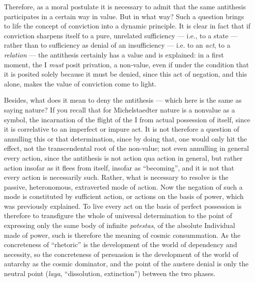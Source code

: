 Therefore, as a moral postulate it is necessary to admit that the same antithesis participates in a certain way in value. But in what way? Such a question brings to life the concept of conviction into a dynamic principle. It is clear in fact that if conviction sharpens itself to a pure, unrelated sufficiency --- i.e., to a state --- rather than to sufficiency as denial of an insufficiency --- i.e. to an \emph{act}, to a \emph{relation} --- the antithesis certainly has a value and is explained: in a first moment, the I \emph{must} posit privation, a non-value, even if under the condition that it is posited solely because it must be denied, since this act of negation, and this alone, makes the value of conviction come to light.

Besides, what does it mean to deny the antithesis --- which here is the same as saying nature? If you recall that for Michelstaedter nature is a nonvalue as a symbol, the incarnation of the flight of the I from actual possession of itself, since it is correlative to an imperfect or impure act. It is not therefore a question of annulling this or that determination, since by doing that, one would only hit the effect, not the transcendental root of the non-value; not even annulling in general every action, since the antithesis is not action qua action in general, but rather action insofar as it flees from itself, insofar as ``becoming'', and it is not that every action is necessarily such. Rather, what is necessary to resolve is the passive, heteronomous, extraverted mode of action. Now the negation of such a mode is constituted by sufficient action, or actions on the basis of power, which was previously explained. To live every act on the basis of perfect possession is therefore to transfigure the whole of universal determination to the point of expressing only the same body of infinite \emph{potestas}, of the absolute Individual made of power, such is therefore the meaning of cosmic consummation. As the concreteness of ``rhetoric'' is the development of the world of dependency and necessity, so the concreteness of persuasion is the development of the world of autarchy as the cosmic dominator, and the point of the austere denial is only the neutral point (\emph{laya}, ``dissolution, extinction'') between the two phases.

